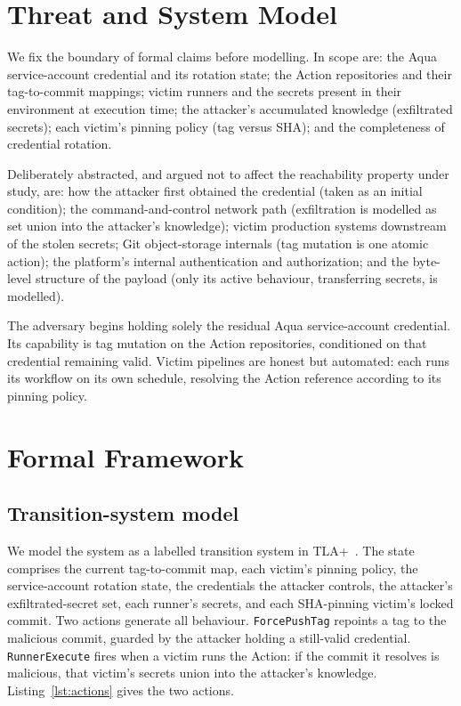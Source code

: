 \documentclass[letterpaper,twocolumn,10pt]{article}
\newcommand{\code}[1]{\texttt{\small #1}}
\begin{document}
\section{Threat and System Model}
We fix the boundary of formal claims before modelling. In scope are: the Aqua service-account credential and its rotation state; the Action repositories and their tag-to-commit mappings; victim runners and the secrets present in their environment at execution time; the attacker's accumulated knowledge (exfiltrated secrets); each victim's pinning policy (tag versus SHA); and the completeness of credential rotation.

Deliberately abstracted, and argued not to affect the reachability property under study, are: how the attacker first obtained the credential (taken as an initial condition); the command-and-control network path (exfiltration is modelled as set union into the attacker's knowledge); victim production systems downstream of the stolen secrets; Git object-storage internals (tag mutation is one atomic action); the platform's internal authentication and authorization; and the byte-level structure of the payload (only its active behaviour, transferring secrets, is modelled).

The adversary begins holding solely the residual Aqua service-account credential. Its capability is tag mutation on the Action repositories, conditioned on that credential remaining valid. Victim pipelines are honest but automated: each runs its workflow on its own schedule, resolving the Action reference according to its pinning policy.

\section{Formal Framework}
\subsection{Transition-system model}
We model the system as a labelled transition system in TLA+~\cite{lamport}. The state comprises the current tag-to-commit map, each victim's pinning policy, the service-account rotation state, the credentials the attacker controls, the attacker's exfiltrated-secret set, each runner's secrets, and each SHA-pinning victim's locked commit. Two actions generate all behaviour. \code{ForcePushTag} repoints a tag to the malicious commit, guarded by the attacker holding a still-valid credential. \code{RunnerExecute} fires when a victim runs the Action: if the commit it resolves is malicious, that victim's secrets union into the attacker's knowledge. Listing~\ref{lst:actions} gives the two actions.
\end{document}

